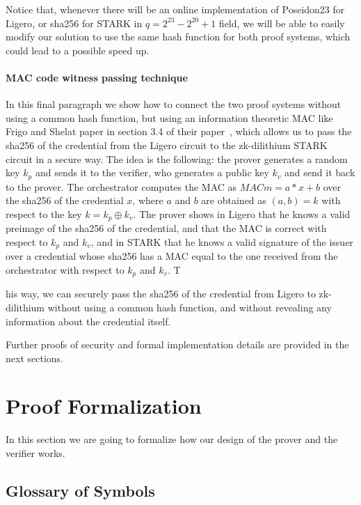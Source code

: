 \documentclass[binding=0.6cm,oneside,noexaminfo]{sapthesis}
\begin{document}
Notice that, whenever there will be an online implementation of Poseidon23 for Ligero, or sha256 for STARK in 
$q = 2^{23} - 2^{20} + 1$ field, we will be able to easily modify our solution to use the same hash function for both proof 
systems, which could lead to a possible speed up.

\paragraph{MAC code witness passing technique}
In this final paragraph we show how to connect the two proof systems without using a common hash function, 
but using an information theoretic MAC like Frigo and Shelat paper in section 3.4 of their paper~\cite{cryptoeprint:2024/2010}, 
which allows us to pass the sha256 of the credential from the Ligero circuit to the zk-dilithium STARK circuit in a secure way.
The idea is the following: the prover generates a random key $k_p$ and sends it to the verifier,
who generates a public key $k_v$ and send it back to the prover. The orchestrator computes the MAC as $MAC m = a*x + b$ over the
sha256 of the credential $x$, where $a$ and $b$ are obtained as $(a,b) = k$ with respect to the key $k = k_p \oplus k_v$. 
The prover shows in Ligero that he knows a valid preimage of the sha256 of the credential, and that the MAC is correct with respect 
to $k_p$ and $k_v$, and in STARK that he knows a valid signature of the issuer over a credential whose sha256 has a MAC equal to the 
one received from the orchestrator with respect to $k_p$ and $k_v$. T

his way, we can securely pass the sha256 of the credential from Ligero to zk-dilithium without using a common hash function, 
and without revealing any information about the credential itself.

Further proofs of security and formal implementation details are provided in the next sections.

\section{Proof Formalization}
\label{formalization}
In this section we are going to formalize how our design of the prover and the verifier works.

\subsection{Glossary of Symbols}
\label{sec:glossary}
\end{document}
